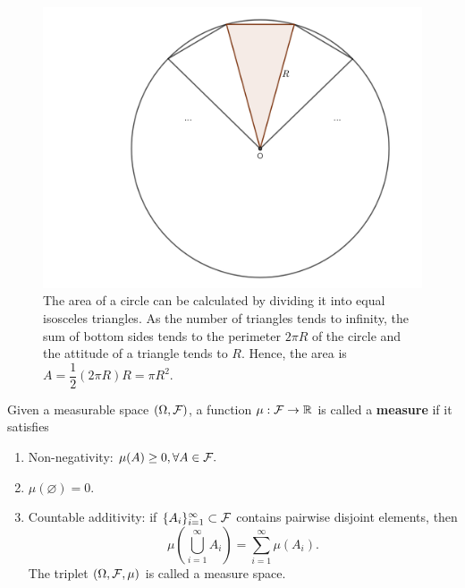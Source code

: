 \begin{figure}[ht]
 \centering
 \includegraphics[width=0.4\linewidth]{img/circle.png}
 \vspace{0.5cm}
 \caption[Circle area approximation]{The area of a circle can be calculated by dividing it into equal isosceles triangles. As the number of triangles tends to infinity, the sum of bottom sides tends to the perimeter $2\pi R$ of the circle and the attitude of a triangle tends to $R$. Hence, the area is $A=\dfrac{1}{2}(2\pi R)R=\pi R^2$.}
 \label{figure:circle}
\end{figure}

\begin{definition}
 Given a measurable space $(\Omega,\mathcal{F})$, a function $\mu:\mathcal{F}\to\mathbb{R}$ is called a \textbf{measure} if it satisfies
 \begin{enumerate}
  \item Non-negativity: $\mu(A)\ge0,\forall A\in\mathcal{F}.$
  \item $\mu(\varnothing)=0$.
  \item Countable additivity: if $\{A_i\}_{i=1}^\infty\subset\mathcal{F}$ contains pairwise disjoint elements, then
        $$\mu\left(\bigcup\limits_{i=1}^\infty A_i\right)=\sum\limits_{i=1}^\infty \mu(A_i).$$
        The triplet $(\Omega,\mathcal{F},\mu)$ is called a measure space.
 \end{enumerate}
\end{definition}


